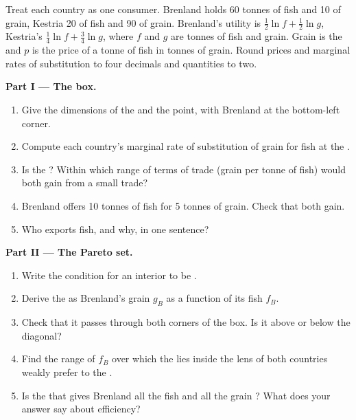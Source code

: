 \begin{problem}
\label{pb:b2:exchange-economies:1}
Treat each country as one consumer. Brenland holds 60 tonnes of fish and 10 of grain, Kestria 20 of fish
and 90 of grain. Brenland's utility is $\tfrac12\ln f + \tfrac12\ln g$, Kestria's $\tfrac14\ln f +
\tfrac34\ln g$, where $f$ and $g$ are tonnes of fish and grain. Grain is the  and $p$ is the
price of a tonne of fish in tonnes of grain. Round prices and marginal rates of substitution to four
decimals and quantities to two.

\medskip
\noindent\textbf{Part I --- The box.}
\begin{enumerate}
  \item Give the dimensions of the  and the  point, with Brenland at the
        bottom-left corner.
  \item Compute each country's marginal rate of substitution of grain for fish at the .
  \item Is the  ? Within which range of terms of trade (grain per tonne of fish)
        would both gain from a small trade?
  \item Brenland offers 10 tonnes of fish for 5 tonnes of grain. Check that both gain.
  \item Who exports fish, and why, in one sentence?
\end{enumerate}

\medskip
\noindent\textbf{Part II --- The Pareto set.}
\begin{enumerate}[resume]
  \item Write the condition for an interior  to be .
  \item Derive the  as Brenland's grain $g_B$ as a function of its fish $f_B$.
  \item Check that it passes through both corners of the box. Is it above or below the diagonal?
  \item Find the range of $f_B$ over which the  lies inside the lens of  both
        countries weakly prefer to the .
  \item Is the  that gives Brenland all the fish and all the grain ? What does
        your answer say about efficiency?
\end{enumerate}


\end{problem}
